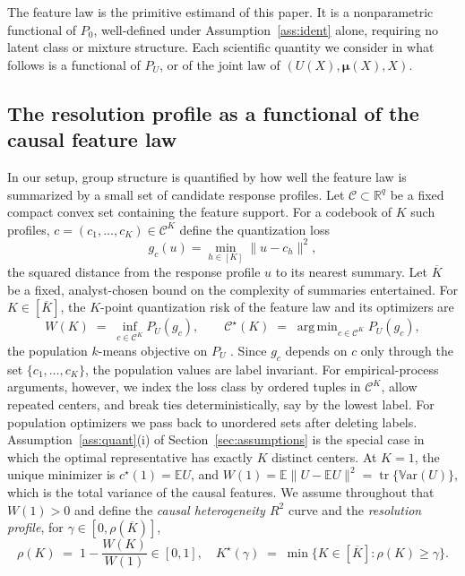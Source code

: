\documentclass[11pt]{article}
\newcommand{\E}{\mathbb E}
\newcommand{\R}{\mathbb R}
\newcommand{\Var}{\mathbb V\mathrm{ar}}
\DeclareMathOperator*{\argmin}{arg\,min}
\newcommand{\tr}{\operatorname{tr}}
\newcommand{\calC}{\mathcal C}
\newcommand{\bmu}{\bm\mu}
\newcommand{\norm}[1]{\lVert #1\rVert}
\begin{document}
The feature law is the primitive estimand of this paper. It is a nonparametric functional of $P_0$, well-defined under Assumption~\ref{ass:ident} alone, requiring no latent class or mixture structure. Each scientific quantity we consider in what follows is a functional of $P_U$, or of the joint law of $(U(X),\bmu(X),X)$.

\subsection{The resolution profile as a functional of the causal feature law}\label{sec:resolution}

In our setup, group structure is quantified by how well the feature law is summarized by a small set of candidate response profiles. Let $\calC\subset\R^q$ be a fixed compact convex set containing the feature support. For a codebook of $K$ such profiles, $c=(c_1,\dots,c_K)\in\calC^K$ define the quantization loss
\begin{equation}\label{eq:quantloss}
g_c(u)=\min_{h\in[K]}\norm{u-c_h}^2 ,
\end{equation}
the squared distance from the response profile $u$ to its nearest summary. Let $\overline K$ be a fixed, analyst-chosen bound on the complexity of summaries entertained. For $K\in[\overline K]$, the $K$-point quantization risk of the feature law and its optimizers are
\begin{equation}\label{eq:WK}
W(K)\;=\;\inf_{c\in\calC^K}P_U(g_c),
\qquad
\calC^\star(K)\;=\;\argmin_{c\in\calC^K}P_U(g_c),
\end{equation}
the population $k$-means objective on $P_U$ \citep{pollard1981,graf2000}. Since $g_c$ depends on $c$ only through the set $\{c_1,\dots,c_K\}$, the population values are label invariant.  For empirical-process arguments, however, we index the loss class by ordered tuples in $\calC^K$, allow repeated centers, and break ties deterministically, say by the lowest label.  For population optimizers we pass back to unordered sets after deleting labels. Assumption~\ref{ass:quant}\textup{(i)} of Section~\ref{sec:assumptions} is the special case in which the optimal representative has exactly $K$ distinct centers. At $K=1$, the unique minimizer is $c^\star(1)=\E U$, and $W(1)=\E\norm{U-\E U}^2=\tr\{\Var(U)\}$, which is the total variance of the causal features. We assume throughout that $W(1)>0$ and define the \emph{causal heterogeneity $R^2$} curve and the \emph{resolution profile}, for $\gamma\in[0,\rho(\overline K)]$,
\begin{equation}\label{eq:profile}
\rho(K)\;=\;1-\frac{W(K)}{W(1)}\in[0,1],
\quad
K^\star(\gamma)\;=\;\min\bigl\{K\in[\overline K]:\rho(K)\ge\gamma\bigr\}.
\end{equation}
\end{document}
